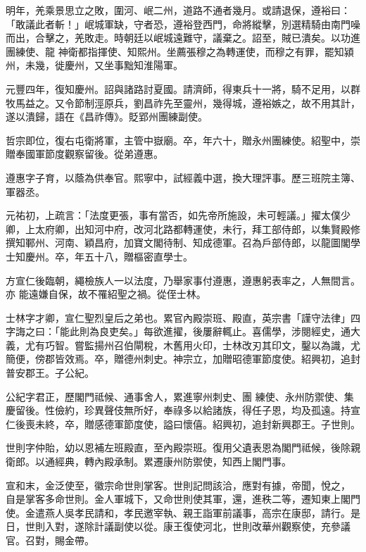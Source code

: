 \begin{pinyinscope}
 明年，羌乘景思立之敗，圍河、岷二州，道路不通者幾月。或請退保，遵裕曰：「敢議此者斬！」岷城軍缺，守者恐，遵裕登西門，命將縱擊，別選精騎由南門噪而出，合擊之，羌敗走。時朝廷以岷城遠難守，議棄之。詔至，賊已潰矣。以功進團練使、龍
 神衛都指揮使、知熙州。坐薦張穆之為轉運使，而穆之有罪，罷知潁州，未幾，徙慶州，又坐事黜知淮陽軍。



 元豐四年，復知慶州。詔與諸路討夏國。請濟師，得東兵十一將，騎不足用，以群牧馬益之。又令節制涇原兵，劉昌祚先至靈州，幾得城，遵裕嫉之，故不用其計，遂以潰歸，語在《昌祚傳》。貶郢州團練副使。



 哲宗即位，復右屯衛將軍，主管中嶽廟。卒，年六十，贈永州團練使。紹聖中，崇贈奉國軍節度觀察留後。從弟遵惠。



 遵惠字子育，以蔭為供奉官。熙寧中，試經義中選，換大理評事。歷三班院主簿、軍器丞。



 元祐初，上疏言：「法度更張，事有當否，如先帝所施設，未可輕議。」擢太僕少卿，上太府卿，出知河中府，改河北路都轉運使，未行，拜工部侍郎，以集賢殿修撰知鄆州、河南、穎昌府，加寶文閣待制、知成德軍。召為戶部侍郎，以龍圖閣學士知慶州。卒，年五十八，贈樞密直學士。



 方宣仁後臨朝，繩檢族人一以法度，乃舉家事付遵惠，遵惠躬表率之，人無間言。亦
 能遠嫌自保，故不罹紹聖之禍。從侄士林。



 士林字才卿，宣仁聖烈皇后之弟也。累官內殿崇班、殿直，英宗書「謹守法律」四字誨之曰：「能此則為良吏矣。」每欲進擢，後屢辭輒止。喜儒學，涉閱經史，通大義，尤有巧智。嘗監揚州召伯閘稅，木舊用火印，士林改刃其印文，鑿以為識，尤簡便，傍郡皆效焉。卒，贈德州刺史。神宗立，加贈昭德軍節度使。紹興初，追封普安郡王。子公紀。



 公紀字君正，歷閣門祗候、通事舍人，累進寧州刺史、團
 練使、永州防禦使、集慶留後。性儉約，珍異聲伎無所好，奉祿多以給諸族，得任子恩，均及孤遠。持宣仁後喪未終，卒，贈感德軍節度使，謚曰懷僖。紹興初，追封新興郡王。子世則。



 世則字仲貽，幼以恩補左班殿直，至內殿崇班。復用父遺表恩為閣門祗候，後除親衛郎。以通經典，轉內殿承制。累遷康州防禦使，知西上閣門事。



 宣和末，金泛使至，徽宗命世則掌客。世則記問該洽，應對有據，帝聞，悅之，
 自是掌客多命世則。金人軍城下，又命世則使其軍，還，進秩二等，遷知東上閣門使。金遣燕人吳孝民請和，孝民邀宰執、親王詣軍前議事，高宗在康邸，請行。是日，世則入對，遂除計議副使以從。康王復使河北，世則改華州觀察使，充參議官。召對，賜金帶。




\end{pinyinscope}
